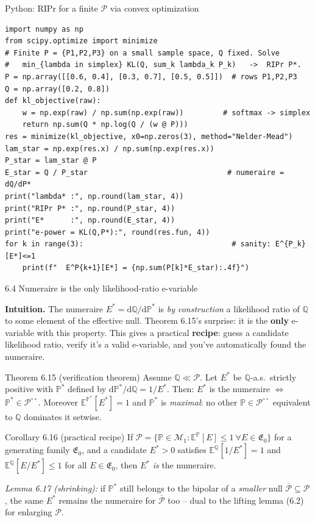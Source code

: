 \documentclass[aspectratio=169,10pt]{beamer}
\newcommand{\bE}{\mathbb{E}}
\newcommand{\bP}{\mathbb{P}}
\newcommand{\bQ}{\mathbb{Q}}
\newcommand{\cP}{\mathcal{P}}
\newcommand{\cE}{\mathfrak{E}}
\begin{document}
\begin{frame}[fragile]{Python: RIPr for a finite $\cP$ via convex optimization}

\begin{lstlisting}
import numpy as np
from scipy.optimize import minimize
# Finite P = {P1,P2,P3} on a small sample space, Q fixed. Solve
#   min_{lambda in simplex} KL(Q, sum_k lambda_k P_k)   ->  RIPr P*.
P = np.array([[0.6, 0.4], [0.3, 0.7], [0.5, 0.5]])  # rows P1,P2,P3
Q = np.array([0.2, 0.8])
def kl_objective(raw):
    w = np.exp(raw) / np.sum(np.exp(raw))         # softmax -> simplex
    return np.sum(Q * np.log(Q / (w @ P)))
res = minimize(kl_objective, x0=np.zeros(3), method="Nelder-Mead")
lam_star = np.exp(res.x) / np.sum(np.exp(res.x))
P_star = lam_star @ P
E_star = Q / P_star                                # numeraire = dQ/dP*
print("lambda* :", np.round(lam_star, 4))
print("RIPr P* :", np.round(P_star, 4))
print("E*      :", np.round(E_star, 4))
print("e-power = KL(Q,P*):", round(res.fun, 4))
for k in range(3):                                  # sanity: E^{P_k}[E*]<=1
    print(f"  E^P{k+1}[E*] = {np.sum(P[k]*E_star):.4f}")
\end{lstlisting}
\end{frame}

\begin{frame}{6.4 Numeraire is the only likelihood-ratio e-variable}

\textbf{Intuition.} The numeraire $E^* = \mathrm{d}\bQ/\mathrm{d}\bP^*$
is \emph{by construction} a likelihood ratio of $\bQ$ to some element
of the effective null. Theorem 6.15's surprise: it is the \textbf{only}
e-variable with this property. This gives a practical \textbf{recipe}:
guess a candidate likelihood ratio, verify it's a valid e-variable, and
you've automatically found the numeraire.

\begin{block}{Theorem 6.15 (verification theorem)}
Assume $\bQ \ll \cP$. Let $E^*$ be $\bQ$-a.s.\ strictly positive with
$\bP^*$ defined by $\mathrm{d}\bP^*/\mathrm{d}\bQ = 1/E^*$. Then:
$E^*$ is the numeraire $\iff$ $\bP^* \in \cP^{\circ\circ}$. Moreover
$\bE^{\bP^*}[E^*]=1$ and $\bP^*$ is \emph{maximal}: no other
$\bP \in \cP^{\circ\circ}$ equivalent to $\bQ$ dominates it setwise.
\end{block}

\begin{block}{Corollary 6.16 (practical recipe)}
If $\cP = \{\bP \in \mathcal{M}_1 : \bE^{\bP}[E]\le 1 \ \forall E \in \cE_0\}$
for a generating family $\cE_0$, and a candidate $E^*>0$ satisfies
$\bE^{\bQ}[1/E^*] = 1$ and $\bE^{\bQ}[E/E^*] \le 1$ for all $E \in \cE_0$,
then $E^*$ \emph{is} the numeraire.
\end{block}

\emph{Lemma 6.17 (shrinking):} if $\bP^*$ still belongs to the bipolar
of a \emph{smaller} null $\overline{\cP} \subseteq \cP$, the same $E^*$
remains the numeraire for $\overline{\cP}$ too -- dual to the lifting
lemma (6.2) for enlarging $\cP$.
\end{frame}
\end{document}
